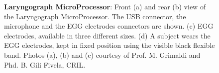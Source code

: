 \begin{figure}
	\centering
	  \hspace{0.05\textwidth}
	  
	  \hspace{0.05\textwidth}

	\caption[Laryngograph MicroProcessor]{\textbf{Laryngograph MicroProcessor}:
	Front (a) and rear (b) view of the Laryngograph MicroProcessor. The USB
	connector, the microphone and the EGG electrodes connectors are
	shown. (c) EGG electrodes, available in three different sizes. (d) A subject
	wears the EGG electrodes, kept in fixed position using the visible black
	flexible band.
	Photos (a), (b) and (c) courtesy of Prof. M. Grimaldi and Phd. B. Gili Fivela, CRIL.}
	\label{fig:linguometer:lg:intro}
\end{figure}
